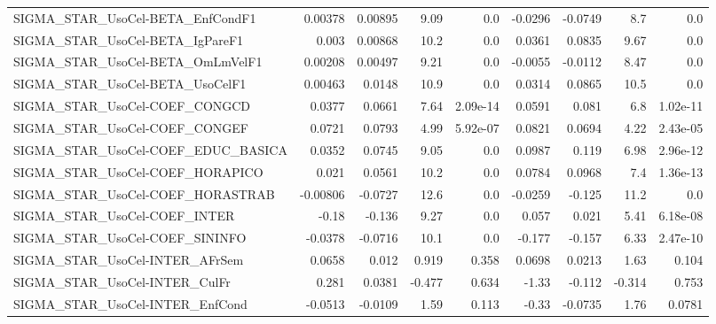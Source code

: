 \begin{tabular}{lrrrrrrrr}
SIGMA\_STAR\_UsoCel-BETA\_EnfCondF1      &     0.00378 &      0.00895 &    9.09 &      0.0 &    -0.0296 &     -0.0749 &          8.7 &           0.0 \\
SIGMA\_STAR\_UsoCel-BETA\_IgPareF1       &       0.003 &      0.00868 &    10.2 &      0.0 &     0.0361 &      0.0835 &         9.67 &           0.0 \\
SIGMA\_STAR\_UsoCel-BETA\_OmLmVelF1      &     0.00208 &      0.00497 &    9.21 &      0.0 &    -0.0055 &     -0.0112 &         8.47 &           0.0 \\
SIGMA\_STAR\_UsoCel-BETA\_UsoCelF1       &     0.00463 &       0.0148 &    10.9 &      0.0 &     0.0314 &      0.0865 &         10.5 &           0.0 \\
SIGMA\_STAR\_UsoCel-COEF\_CONGCD         &      0.0377 &       0.0661 &    7.64 & 2.09e-14 &     0.0591 &       0.081 &          6.8 &      1.02e-11 \\
SIGMA\_STAR\_UsoCel-COEF\_CONGEF         &      0.0721 &       0.0793 &    4.99 & 5.92e-07 &     0.0821 &      0.0694 &         4.22 &      2.43e-05 \\
SIGMA\_STAR\_UsoCel-COEF\_EDUC\_BASICA    &      0.0352 &       0.0745 &    9.05 &      0.0 &     0.0987 &       0.119 &         6.98 &      2.96e-12 \\
SIGMA\_STAR\_UsoCel-COEF\_HORAPICO       &       0.021 &       0.0561 &    10.2 &      0.0 &     0.0784 &      0.0968 &          7.4 &      1.36e-13 \\
SIGMA\_STAR\_UsoCel-COEF\_HORASTRAB      &    -0.00806 &      -0.0727 &    12.6 &      0.0 &    -0.0259 &      -0.125 &         11.2 &           0.0 \\
SIGMA\_STAR\_UsoCel-COEF\_INTER          &       -0.18 &       -0.136 &    9.27 &      0.0 &      0.057 &       0.021 &         5.41 &      6.18e-08 \\
SIGMA\_STAR\_UsoCel-COEF\_SININFO        &     -0.0378 &      -0.0716 &    10.1 &      0.0 &     -0.177 &      -0.157 &         6.33 &      2.47e-10 \\
SIGMA\_STAR\_UsoCel-INTER\_AFrSem        &      0.0658 &        0.012 &   0.919 &    0.358 &     0.0698 &      0.0213 &         1.63 &         0.104 \\
SIGMA\_STAR\_UsoCel-INTER\_CulFr         &       0.281 &       0.0381 &  -0.477 &    0.634 &      -1.33 &      -0.112 &       -0.314 &         0.753 \\
SIGMA\_STAR\_UsoCel-INTER\_EnfCond       &     -0.0513 &      -0.0109 &    1.59 &    0.113 &      -0.33 &     -0.0735 &         1.76 &        0.0781 \\

\end{tabular}
